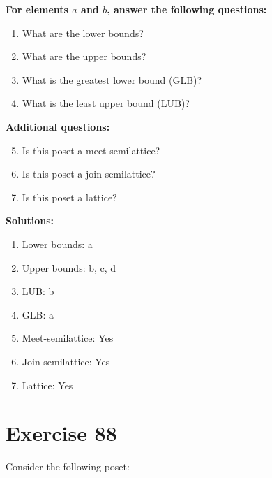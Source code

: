 \documentclass{article}
\begin{document}
    \textbf{For elements $a$ and $b$, answer the following questions:}
\begin{enumerate}
    \item What are the lower bounds?
    \item What are the upper bounds?
    \item What is the greatest lower bound (GLB)?
    \item What is the least upper bound (LUB)?
\end{enumerate}
    \hspace*{3ex} \textbf{Additional questions:}
\begin{enumerate}
    \setcounter{enumi}{4}
    \item Is this poset a meet-semilattice?
    \item Is this poset a join-semilattice?
    \item Is this poset a lattice?
\end{enumerate}

\textbf{Solutions:}
\begin{enumerate}
    \item Lower bounds: {a}
    \item Upper bounds: {b, c, d}
    \item LUB: b
    \item GLB: a
    \item Meet-semilattice: Yes
    \item Join-semilattice: Yes
    \item Lattice: Yes
\end{enumerate}
\newpage
\section*{Exercise 88}
Consider the following poset:
\begin{center}
\end{center}
\end{document}
